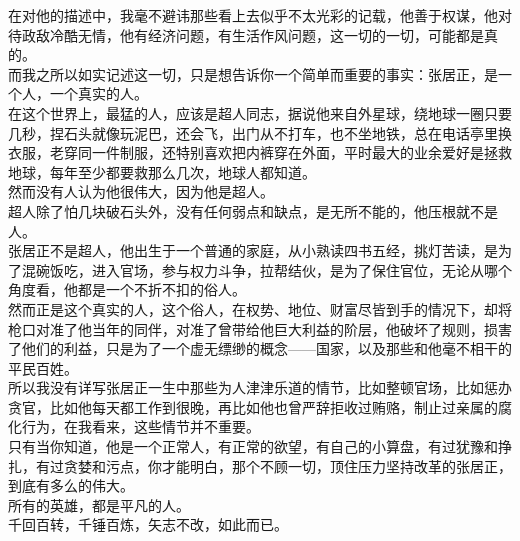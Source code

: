 \begin{multicols}{\theparacolNo}
在对他的描述中，我毫不避讳那些看上去似乎不太光彩的记载，他善于权谋，他对待政敌冷酷无情，他有经济问题，有生活作风问题，这一切的一切，可能都是真的。\\

而我之所以如实记述这一切，只是想告诉你一个简单而重要的事实：张居正，是一个人，一个真实的人。\\

在这个世界上，最猛的人，应该是超人同志，据说他来自外星球，绕地球一圈只要几秒，捏石头就像玩泥巴，还会飞，出门从不打车，也不坐地铁，总在电话亭里换衣服，老穿同一件制服，还特别喜欢把内裤穿在外面，平时最大的业余爱好是拯救地球，每年至少都要救那么几次，地球人都知道。\\

然而没有人认为他很伟大，因为他是超人。\\

超人除了怕几块破石头外，没有任何弱点和缺点，是无所不能的，他压根就不是人。\\

张居正不是超人，他出生于一个普通的家庭，从小熟读四书五经，挑灯苦读，是为了混碗饭吃，进入官场，参与权力斗争，拉帮结伙，是为了保住官位，无论从哪个角度看，他都是一个不折不扣的俗人。\\

然而正是这个真实的人，这个俗人，在权势、地位、财富尽皆到手的情况下，却将枪口对准了他当年的同伴，对准了曾带给他巨大利益的阶层，他破坏了规则，损害了他们的利益，只是为了一个虚无缥缈的概念——国家，以及那些和他毫不相干的平民百姓。\\

所以我没有详写张居正一生中那些为人津津乐道的情节，比如整顿官场，比如惩办贪官，比如他每天都工作到很晚，再比如他也曾严辞拒收过贿赂，制止过亲属的腐化行为，在我看来，这些情节并不重要。\\

只有当你知道，他是一个正常人，有正常的欲望，有自己的小算盘，有过犹豫和挣扎，有过贪婪和污点，你才能明白，那个不顾一切，顶住压力坚持改革的张居正，到底有多么的伟大。\\

所有的英雄，都是平凡的人。\\

千回百转，千锤百炼，矢志不改，如此而已。\\
\ifnum{}
	\end{multicols}
\fi
\newpage

